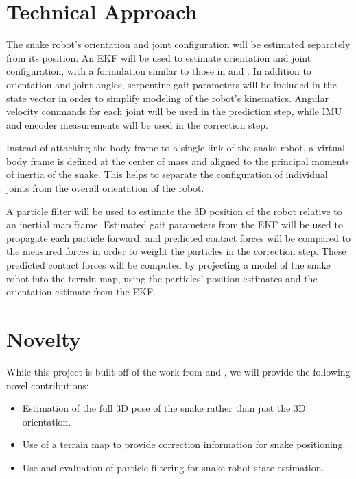 \documentclass[letterpaper, 10 pt, conference]{ieeeconf}  %
\begin{document}
\section{Technical Approach}

The snake robot's orientation and joint configuration will be estimated separately from its position. An EKF will be used to estimate orientation and joint configuration, with a formulation similar to those in \cite{c1} and \cite{c2}. In addition to orientation and joint angles, serpentine gait parameters will be included in the state vector in order to simplify modeling of the robot's kinematics. Angular velocity commands for each joint will be used in the prediction step, while IMU and encoder measurements will be used in the correction step. 

Instead of attaching the body frame to a single link of the snake robot, a virtual body frame is defined at the center of mass and aligned to the principal moments of inertia of the snake. This helps to separate the configuration of individual joints from the overall orientation of the robot.

A particle filter will be used to estimate the 3D position of the robot relative to an inertial map frame. Estimated gait parameters from the EKF will be used to propagate each particle forward, and predicted contact forces will be compared to the measured forces in order to weight the particles in the correction step.  
These predicted contact forces will be computed by projecting a model of the snake robot into the terrain map, using the particles' position estimates and the orientation estimate from the EKF.

\section{Novelty}
While this project is built off of the work from \cite{c1} and \cite{c2}, we will provide the following novel contributions:
\begin{itemize}
    \item Estimation of the full 3D pose of the snake rather than just the 3D orientation.
    \item Use of a terrain map to provide correction information for snake positioning.
    \item Use and evaluation of particle filtering for snake robot state estimation.
\end{itemize} 
\end{document}
